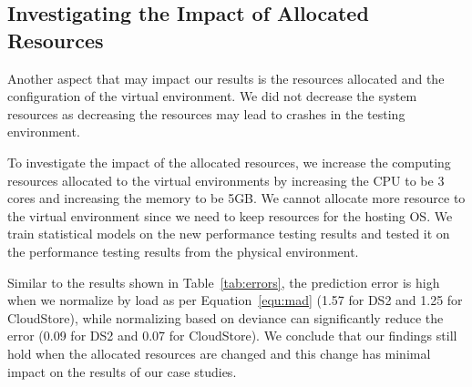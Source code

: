 \subsection{Investigating the Impact of Allocated Resources}

Another aspect that may impact our results is the resources allocated and the configuration of the virtual environment. We did not decrease the system resources as decreasing the resources may lead to crashes in the testing environment.

To investigate the impact of the allocated resources, we increase the computing resources allocated to the virtual environments by increasing the CPU to be 3 cores and increasing the memory to be 5GB. We cannot allocate more resource to the virtual environment since we need to keep resources for the hosting OS. We train statistical models on the new performance testing results and tested it on the performance testing results from the physical environment. 

Similar to the results shown in Table~\ref{tab:errors}, the prediction error is high when we normalize by load as per Equation~\ref{equ:mad} (1.57 for DS2 and 1.25 for CloudStore), while normalizing based on deviance can significantly reduce the error (0.09 for DS2 and 0.07 for CloudStore). We conclude that our findings still hold when the allocated resources are changed and this change has minimal impact on the results of our case studies.

